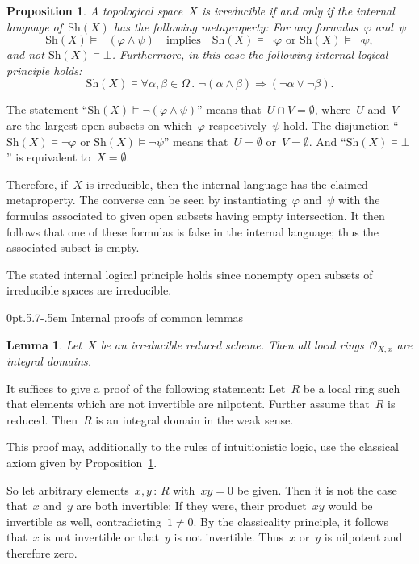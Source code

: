 \documentclass[10pt,reqno,a4paper]{amsbook}
\makeatletter
\theoremstyle{definition}
\theoremstyle{plain}
\newtheorem{prop}[defn]{Proposition}
\newtheorem{lemma}[defn]{Lemma}
\theoremstyle{remark}
\renewcommand{\O}{\mathcal{O}}
\newcommand{\Sh}{\mathrm{Sh}}
\newcommand{\?}{\,{:}\,}
\renewcommand{\_}{\mathpunct{.}\,}
\renewenvironment{proof}[1][\proofname]{\par
  \pushQED{\qed}%
  \normalfont \topsep6\p@\@plus6\p@\relax
  \trivlist
  \item[\hskip\labelsep
        \itshape
    #1\@addpunct{.}]\ignorespaces
}{%
  \popQED\endtrivlist\@endpefalse
}
\def\subsection{\@startsection{subsection}{2}%
  {0pt}{.5\linespacing\@plus.7\linespacing}{-.5em}%
  {\normalfont\bfseries}}
\makeatother
\begin{document}
\begin{prop}\label{prop:irreducibility-internally}
A topological space~$X$ is irreducible if and only if the internal
language of~$\Sh(X)$ has the following metaproperty: For any
formulas~$\varphi$ and~$\psi$
\[ \Sh(X) \models \neg(\varphi \wedge \psi)
  \quad\text{implies}\quad
  \Sh(X) \models \neg\varphi \text{ or }
  \Sh(X) \models \neg\psi, \]
and not $\Sh(X) \models \bot$.
Furthermore, in this case the following internal logical principle holds:
\[ \Sh(X) \models \forall \alpha,\beta \in \Omega\_
  \neg(\alpha \wedge \beta) \Rightarrow (\neg\alpha \vee \neg\beta). \]
\end{prop}
\begin{proof}The statement ``$\Sh(X) \models \neg(\varphi \wedge \psi)$'' means
that~$U \cap V = \emptyset$, where~$U$ and~$V$ are the largest open subsets on
which~$\varphi$ respectively~$\psi$ hold. The disjunction ``$\Sh(X) \models
\neg\varphi$ or $\Sh(X) \models \neg\psi$'' means that~$U = \emptyset$ or~$V =
\emptyset$. And ``$\Sh(X) \models \bot$'' is equivalent to~$X = \emptyset$.

Therefore, if~$X$ is irreducible, then the internal language has the claimed metaproperty. The converse
can be seen by instantiating~$\varphi$ and~$\psi$ with the formulas associated
to given open subsets having empty intersection. It then follows that one of
these formulas is false in the internal language; thus the associated subset is
empty.

The stated internal logical principle holds since nonempty open subsets of irreducible spaces are
irreducible.
\end{proof}


\subsection{Internal proofs of common lemmas}

\begin{lemma}Let~$X$ be an irreducible reduced scheme. Then all local
rings~$\O_{X,x}$ are integral domains.\end{lemma}
\begin{proof}It suffices to give a proof of the following statement: Let~$R$ be
a local ring such that elements which are not invertible are nilpotent. Further
assume that~$R$ is reduced. Then~$R$ is an integral domain in the weak sense.

This proof may, additionally to the rules of intuitionistic logic, use the
classical axiom given by Proposition~\ref{prop:irreducibility-internally}.

So let arbitrary elements~$x,y \? R$ with~$xy = 0$ be given. Then it is not the
case that~$x$ and~$y$ are both invertible: If they were, their product~$xy$
would be invertible as well, contradicting~$1 \neq 0$. By the classicality
principle, it follows that~$x$ is not invertible or that~$y$ is not invertible.
Thus~$x$ or~$y$ is nilpotent and therefore zero.
\end{proof}
\end{document}
